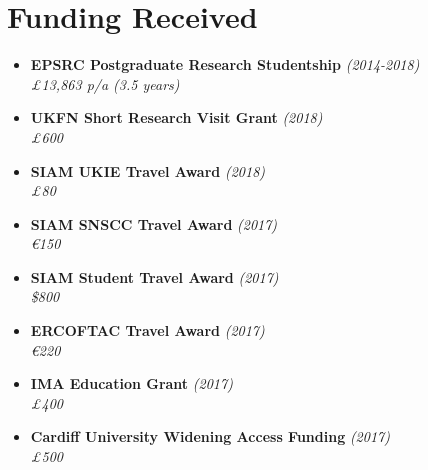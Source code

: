 \documentclass[10pt,a4paper,sans]{moderncv}        %
\begin{document}
\section{Funding Received}
\begin{multicols}{2}

\vspace{6pt}

\begin{itemize}

\item \textbf{EPSRC Postgraduate Research Studentship} \textit{(2014-2018)} \\
\textit{£13,863 p/a (3.5 years)}

\vspace{6pt}

\item \textbf{UKFN Short Research Visit Grant} \textit{(2018)}\\
\textit{£600}

\vspace{6pt}

\item \textbf{SIAM UKIE Travel Award} \textit{(2018)}\\
\textit{£80}

\vspace{6pt}

\item \textbf{SIAM SNSCC Travel Award} \textit{(2017)}\\
\textit{\euro{}150}

\vspace{6pt}

\item \textbf{SIAM Student Travel Award} \textit{(2017)}\\
\textit{\$800}

\vspace{13pt}

\item \textbf{ERCOFTAC Travel Award} \textit{(2017)}\\
\textit{\euro{}220}

\vspace{6pt}

\item \textbf{IMA Education Grant} \textit{(2017)}\\
\textit{£400}

\vspace{6pt}

\item \textbf{Cardiff University Widening Access Funding} \textit{(2017)}\\
\textit{£500}


\end{itemize}
\end{multicols}
\end{document}

